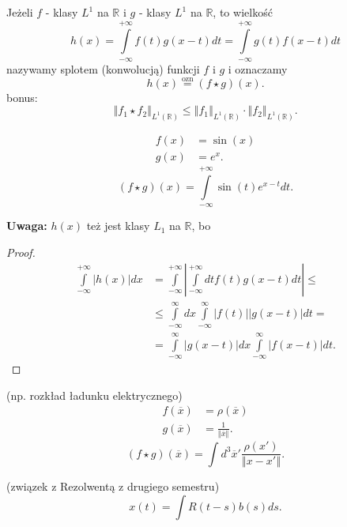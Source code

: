 \documentclass[../main.tex]{subfiles}
\begin{document}
    \begin{definicja}
        Jeżeli $f$ - klasy $L^1$ na $\mathbb{R}$ i $g$ - klasy $L^1$ na $\mathbb{R}$, to wielkość
        \[
            h(x) = \int\limits_{-\infty}^{+\infty}f(t)g(x-t)dt = \int\limits_{-\infty}^{+\infty}g(t)f(x-t)dt
        \]
        nazywamy splotem (konwolucją) funkcji $f$ i $g$ i oznaczamy
        \[
            h(x) \overset{\text{ozn}}{=} \left( f \star g \right) (x)
        .\]
    bonus:
        \[
            \left\Vert f_1\star f_2 \right\Vert_{L^1(\mathbb{R})} \le \left\Vert f_1 \right\Vert_{L^1(\mathbb{R})} \cdot \left\Vert f_2 \right\Vert_{L^1(\mathbb{R})}
        .\]
    \end{definicja}
    \begin{przyklad}
        \begin{align*}
            f(x) &= \sin(x)\\
            g(x) &= e^x
        .\end{align*}
        \[
            \left( f\star g \right) (x) = \int\limits_{-\infty}^{+\infty}\sin(t)e^{x-t}dt
        .\]
    \end{przyklad}
    \textbf{Uwaga:} $h(x)$ też jest klasy $L_1$ na $\mathbb{R}$, bo
    \begin{proof}
        \begin{align*}
            \int\limits_{-\infty}^{+\infty}\left|  h(x) \right| dx &= \int\limits_{-\infty}^{+\infty}\left| \int\limits_{-\infty}^{+\infty}dt f(t) g(x-t)dt \right| \le \\
            &\le \int\limits_{-\infty}^{\infty} dx \int\limits_{-\infty}^{\infty} \left| f(t) \right| \left| g(x-t) \right| dt =\\
            &=\int\limits_{-\infty}^{\infty} \left| g(x-t) \right| dx \int\limits_{-\infty}^{\infty} \left| f(x-t) \right| dt
        .\end{align*}
    \end{proof}
    \begin{przyklad}
        (np. rozkład ładunku elektrycznego)
        \begin{align*}
            f(\overline{x}) &= \rho(\overline{x})\\
            g(\overline{x}) &= \frac{1}{\left\Vert \overline{x} \right\Vert }
        .\end{align*}
        \[
            \left( f\star g \right) (\overline{x}) = \int d^3 \overline{x}' \frac{\rho(x')}{\left\Vert x - x' \right\Vert }
        .\]
    \end{przyklad}
    \begin{przyklad}
        (związek z Rezolwentą z drugiego semestru)
        \[
            x(t) = \int R(t-s)b(s)ds
        .\]
    \end{przyklad}
\end{document}

